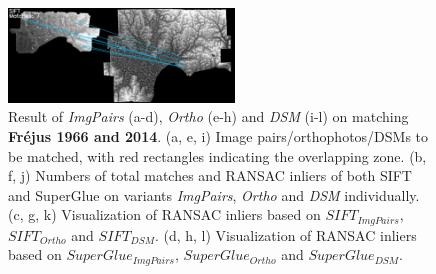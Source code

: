 \begin{figure}[htbp]
\begin{center}
{\begin{minipage}[t]{0.48\linewidth}
				\centering
				\includegraphics[width=6cm]{images/Chapitre3/Homol-SIFT2Step-Rough-2DRANSAC_MEC-Malt_Tapas_1966_MEC-Malt_2014.png}
			\end{minipage}%
		}
		\caption{Result of \textit{ImgPairs} (a-d), \textit{Ortho} (e-h) and \textit{DSM} (i-l) on matching \textbf{Fr{\'e}jus 1966 and 2014}. (a, e, i) Image pairs/orthophotos/\ac{DSM}s to be matched, with red rectangles indicating the overlapping zone. (b, f, j) Numbers of total matches and RANSAC inliers of both SIFT and SuperGlue on variants \textit{ImgPairs}, \textit{Ortho} and \textit{DSM} individually. (c, g, k) Visualization of RANSAC inliers based on $SIFT_{ImgPairs}$, $SIFT_{Ortho}$ and $SIFT_{DSM}$. (d, h, l) Visualization of RANSAC inliers based on $SuperGlue_{ImgPairs}$, $SuperGlue_{Ortho}$ and $SuperGlue_{DSM}$.}
		\label{MatchVizFrejus1966DSM}
	\end{center}
\end{figure} 




